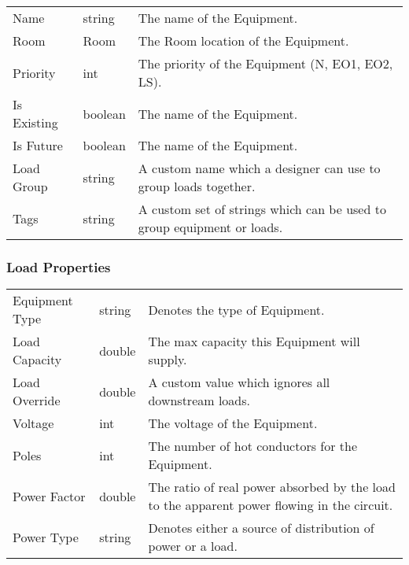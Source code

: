 \documentclass[letterpaper,10pt,english]{sphinxmanual}
\begin{document}
\begin{savenotes}\sphinxattablestart
\centering
\begin{tabulary}{\linewidth}[t]{|T|T|T|}
\hline
\sphinxstyletheadfamily 
{}
&\sphinxstyletheadfamily 
{}
&\sphinxstyletheadfamily 
{}
\\
\hline
Name
&
string
&
The name of the Equipment.
\\
\hline
Room
&
Room
&
The Room location of the Equipment.
\\
\hline
Priority
&
int
&
The priority of the Equipment (N, EO1, EO2, LS).
\\
\hline
Is Existing
&
boolean
&
The name of the Equipment.
\\
\hline
Is Future
&
boolean
&
The name of the Equipment.
\\
\hline
Load Group
&
string
&
A custom name which a designer can use to group loads together.
\\
\hline
Tags
&
string
&
A custom set of strings which can be used to group equipment or loads.
\\
\hline
\end{tabulary}
\par
\sphinxattableend\end{savenotes}


\subsubsection{Load Properties}
\label{\detokenize{docs/definitions/index-definitions:load-properties}}\label{\detokenize{docs/definitions/index-definitions:load-properties-definitions}}

\begin{savenotes}\sphinxattablestart
\centering
\begin{tabulary}{\linewidth}[t]{|T|T|T|}
\hline

&
&
\\
\hline
Equipment Type
&
string
&
Denotes the type of Equipment.
\\
\hline
Load Capacity
&
double
&
The max capacity this Equipment will supply.
\\
\hline
Load Override
&
double
&
A custom value which ignores all downstream loads.
\\
\hline
Voltage
&
int
&
The voltage of the Equipment.
\\
\hline
Poles
&
int
&
The number of hot conductors for the Equipment.
\\
\hline
Power Factor
&
double
&
The ratio of real power absorbed by the load to the apparent power flowing in the circuit.
\\
\hline
Power Type
&
string
&
Denotes either a source of distribution of power or a load.
\\
\hline
\end{tabulary}
\par
\sphinxattableend\end{savenotes}
\end{document}
